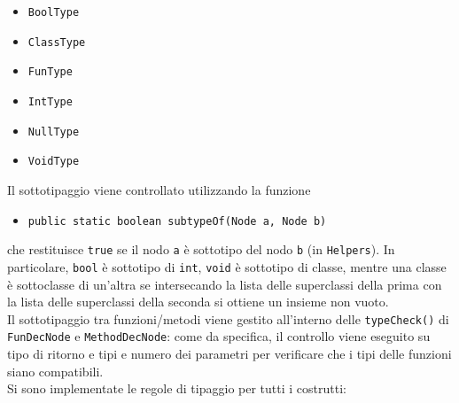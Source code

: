 \documentclass[a4paper]{article}   %
\begin{document}
\begin{itemize}
  \item \lstinline|BoolType|
  \item \lstinline|ClassType|
  \item \lstinline|FunType|
  \item \lstinline|IntType|
  \item \lstinline|NullType|
  \item \lstinline|VoidType|
\end{itemize}

Il sottotipaggio viene controllato utilizzando la funzione
\begin{itemize}
\item \lstinline|public static boolean subtypeOf(Node a, Node b)|
\end{itemize}
che restituisce \lstinline|true| se il nodo \lstinline|a| è sottotipo del nodo \lstinline|b| (in \lstinline|Helpers|).
In particolare, \lstinline|bool| è sottotipo di \lstinline|int|, \lstinline|void| è sottotipo di classe, mentre una classe è sottoclasse di un'altra se intersecando la lista delle superclassi della prima con la lista delle superclassi della seconda si ottiene un insieme non vuoto.\\
Il sottotipaggio tra funzioni/metodi viene gestito all'interno delle \lstinline|typeCheck()| di \lstinline|FunDecNode| e \lstinline|MethodDecNode|: come da specifica, il controllo viene eseguito
su tipo di ritorno e tipi e numero dei parametri per verificare che i tipi delle funzioni siano compatibili.\\
\newline
Si sono implementate le regole di tipaggio per tutti i costrutti:
\end{document}
